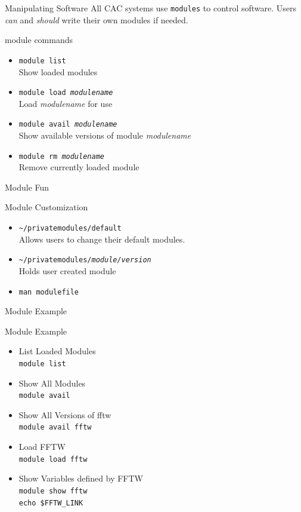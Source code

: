 \documentclass[handout]{beamer}
\begin{document}
\begin{frame}{Manipulating Software}
  All CAC systems use \texttt{modules} to control software. Users \textit{can} and \textit{should} write their own modules if needed.
  \begin{block}{module commands}
  \begin{itemize}
    \item \texttt{module list} \\ Show loaded modules
    \item \texttt{module load \textit{modulename}} \\  Load \textit{modulename} for use
    \item \texttt{module avail \textit{modulename}} \\ Show available versions of module \textit{modulename}
    \item \texttt{module rm \textit{modulename}} \\  Remove currently loaded module
  \end{itemize}
  \end{block}
\end{frame}
\begin{frame}{Module Fun}
  \begin{block}{Module Customization}
  \begin{itemize}
  \item \texttt{\~{}/privatemodules/default}
   \\    Allows users to change their default modules.
  \item \texttt{\~{}/privatemodules/\textit{module/version}}
   \\    Holds user created module
  \item \texttt{man modulefile}
  \end{itemize}
  \end{block}
\end{frame}
\begin{frame}{Module Example}
 \begin{block}{Module Example}
  \begin{itemize}
    \item<1-> List Loaded Modules
         \\ \texttt{module list}
    \item<2-> Show All Modules
         \\ \texttt{module avail}
    \item<3-> Show All Versions of fftw
         \\ \texttt{module avail fftw}
    \item<4-> Load FFTW
         \\ \texttt{module load fftw}
    \item<5-> Show Variables defined by FFTW 
         \\ \texttt{module show fftw}
         \\ \texttt{echo \$FFTW\_LINK}
  \end{itemize}
 \end{block}
\end{frame}
 
\end{document}
